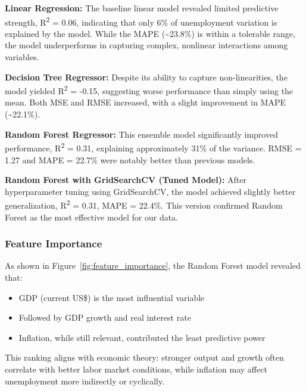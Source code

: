 \documentclass[conference]{IEEEtran}
\begin{document}
\begin{table}[htbp]
    \centering
    \caption{Model Performance Comparison}
    \label{tab:regression}
\end{table}
\textbf{Linear Regression:} The baseline linear model revealed limited predictive strength, R\textsuperscript{2} = 0.06, indicating that only 6\% of unemployment variation is explained by the model. While the MAPE (\textasciitilde23.8\%) is within a tolerable range, the model underperforms in capturing complex, nonlinear interactions among variables.

\textbf{Decision Tree Regressor:} Despite its ability to capture non-linearities, the model yielded R\textsuperscript{2} = -0.15, suggesting worse performance than simply using the mean. Both MSE and RMSE increased, with a slight improvement in MAPE (\textasciitilde22.1\%).

\textbf{Random Forest Regressor:} This ensemble model significantly improved performance, R\textsuperscript{2} = 0.31, explaining approximately 31\% of the variance. RMSE = 1.27 and MAPE = 22.7\% were notably better than previous models.

\textbf{Random Forest with GridSearchCV (Tuned Model):} After hyperparameter tuning using GridSearchCV, the model achieved slightly better generalization, R\textsuperscript{2} = 0.31, MAPE = 22.4\%. This version confirmed Random Forest as the most effective model for our data.

\subsubsection*{Feature Importance}
As shown in Figure~\ref{fig:feature_importance}, the Random Forest model revealed that:
\begin{itemize}
    \item GDP (current US\$) is the most influential variable
    \item Followed by GDP growth and real interest rate
    \item Inflation, while still relevant, contributed the least predictive power
\end{itemize}
This ranking aligns with economic theory: stronger output and growth often correlate with better labor market conditions, while inflation may affect unemployment more indirectly or cyclically.
\end{document}
